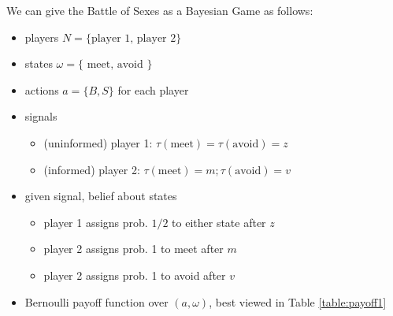 \begin{example}
      We can give the Battle of Sexes as a Bayesian Game as follows:
      \begin{itemize}
            \item players $N = \{\text{player 1, player 2}\}$
            \item states $\omega = \{\text { meet, avoid }\}$
            \item actions $a = \{ B , S \}$ for each player
            \item signals
                  \begin{itemize}
                        \item (uninformed) player 1: $\tau(\text {meet})=\tau(\text {avoid})=z$
                        \item (informed) player 2: $\tau(\text {meet})=m ; \tau(\text {avoid})=v$
                  \end{itemize}
            \item given signal, belief about states
                  \begin{itemize}
                        \item player 1 assigns prob. $1 / 2$ to either state after $z$
                        \item player 2 assigns prob. 1 to meet after $m$
                        \item player 2 assigns prob. 1 to avoid after $v$
                  \end{itemize}
            \item Bernoulli payoff function over $(a, \omega)$, best viewed in Table \ref{table:payoff1}
      \end{itemize}
\end{example}


